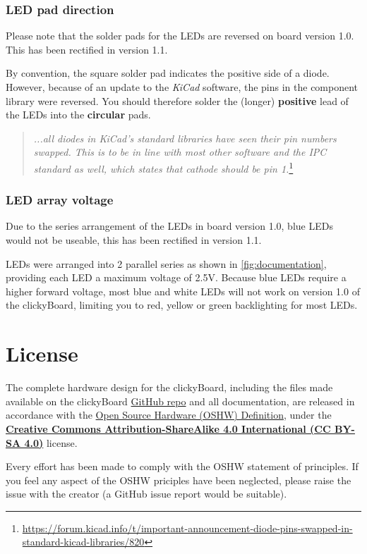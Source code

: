 \documentclass[10pt, a4paper, onesided]{article}
\begin{document}
		\subsubsection*{LED pad direction}
		\label{LEDerror}
		
		Please note that the solder pads for the LEDs are reversed on board version 1.0. This has been rectified in version 1.1.
		
		By convention, the square solder pad indicates the positive side of a diode. However, because of an update to the \textit{KiCad} software, the pins in the component library were reversed. You should therefore solder the (longer) \textbf{positive} lead of the LEDs into the \textbf{circular} pads. 
		
		\begin{quote}
			\textit{...all diodes in KiCad's standard libraries have seen their pin numbers swapped. This is to be in line with most other software and the IPC standard as well, which states that cathode should be pin 1.}\footnote{\url{https://forum.kicad.info/t/important-announcement-diode-pins-swapped-in-standard-kicad-libraries/820}}
		\end{quote}
	
		\subsubsection*{LED array voltage}
		\label{LEDerror2}
		
		Due to the series arrangement of the LEDs in board version 1.0, blue LEDs would not be useable, this has been rectified in version 1.1.
		
		LEDs were arranged into 2 parallel series as shown in \autoref{fig:documentation}, providing each LED a maximum voltage of 2.5V. Because blue LEDs require a higher forward voltage, most blue and white LEDs will not work on version 1.0 of the clickyBoard, limiting you to red, yellow or green backlighting for most LEDs.
\fi

\newpage
\section{License}

	The complete hardware design for the clickyBoard, including the files made available on the clickyBoard \href{https://github.com/SecretImbecile/clickyBoard}{GitHub repo} and all documentation, are released in accordance with the \href{https://www.oshwa.org/definition/}{Open Source Hardware (OSHW) Definition}, under the \href{https://creativecommons.org/licenses/by-sa/4.0/}{\textbf{Creative Commons Attribution-ShareAlike 4.0 International (CC BY-SA 4.0)}} license.
	
	Every effort has been made to comply with the OSHW statement of principles. If you feel any aspect of the OSHW priciples have been neglected, please raise the issue with the creator (a GitHub issue report would be suitable).
\end{document}
